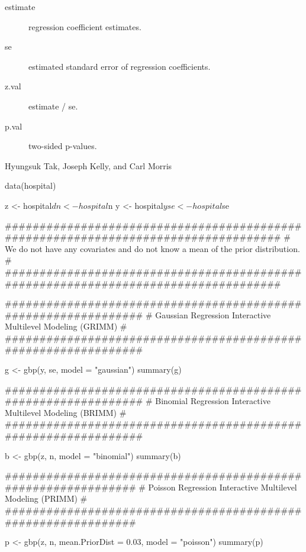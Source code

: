\documentclass[a4paper]{book}
\begin{document}
\begin{Value}
\begin{ldescription}
\begin{description}
\end{description}


\item[\code{Regression Summary (if fitted)}] 
\begin{description}

\item[estimate] regression coefficient estimates.
\item[se] estimated standard error of regression coefficients.
\item[z.val] estimate / se.
\item[p.val] two-sided p-values.

\end{description}


\end{ldescription}
\end{Value}
%
\begin{Author}\relax
Hyungsuk Tak, Joseph Kelly, and Carl Morris
\end{Author}
%
\begin{Examples}
\begin{ExampleCode}

  data(hospital)

  z <- hospital$d
  n <- hospital$n
  y <- hospital$y
  se <- hospital$se
  
  ###################################################################################
  # We do not have any covariates and do not know a mean of the prior distribution. #
  ###################################################################################

    ###############################################################
    # Gaussian Regression Interactive Multilevel Modeling (GRIMM) #
    ###############################################################

    g <- gbp(y, se, model = "gaussian")
    summary(g)

    ###############################################################
    # Binomial Regression Interactive Multilevel Modeling (BRIMM) #
    ###############################################################

    b <- gbp(z, n, model = "binomial")
    summary(b)

    ##############################################################
    # Poisson Regression Interactive Multilevel Modeling (PRIMM) #
    ##############################################################

    p <- gbp(z, n, mean.PriorDist = 0.03, model = "poisson")
    summary(p)

\end{ExampleCode}
\end{Examples}
\end{document}
